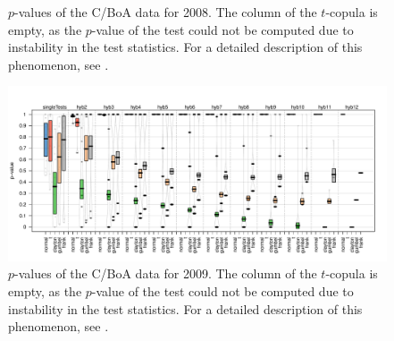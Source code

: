 \begin{appendices}
\begin{figure}[H]
	\caption{$p$-values of the C/BoA data for 2008. The column \mycolor \protect{} \bk of the $t$-copula is empty, as the $p$-value of the test \protect{} could not be computed due to instability in the test statistics. For a detailed description of this phenomenon, see \citet{schepsmeier2018package}.}
	\label{Pirateplot_C_BoA_08}
\end{figure}
\vspace{-0.5cm}
\begin{figure}[H]
	\centering
 \includegraphics[width=\textwidth]{img/C_BoA_09.pdf}
	\caption{$p$-values of the C/BoA data for 2009. The column \mycolor \protect{} \bk of the $t$-copula is empty, as the $p$-value of the test \protect{} could not be computed due to instability in the test statistics. For a detailed description of this phenomenon, see \citet{schepsmeier2018package}.}
	\label{Pirateplot_C_BoA_09}
\end{figure}


\end{appendices}

